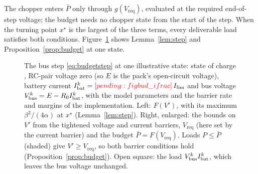The chopper enters $\bar P$ only through $g(V_{\mathrm{req}})$, evaluated at the required end-of-step voltage; the budget needs no chopper state from the start of the step. When the turning point $x^\star$ is the largest of the three terms, every deliverable load satisfies both conditions. Figure~\ref{fig:budget} shows Lemma~\ref{lem:step} and Proposition~\ref{prop:budget} at one state.
\begin{figure}[tbp]\centering{}\caption{The bus step \eqref{eq:budgetstep} at one illustrative state: state of charge , RC-pair voltage zero (so $E$ is the pack's open-circuit voltage), battery current $\Ib^k=\res{figbud_ifrac}\,I_{\lim}$ and bus voltage $V_{\mathrm{bus}}^k=E-R_0I_{\mathrm{bat}}^k$, with the model parameters and the barrier rate and margins of the implementation. Left: $F(V')$, with its maximum $\beta^2/(4\alpha)$ at $x^\star$ (Lemma~\ref{lem:step}). Right, enlarged: the bounds on $V'$ from the tightened voltage and current barriers, $V_{\mathrm{req}}$ (here set by the current barrier) and the budget $\bar P=F(V_{\mathrm{req}})$. Loads $P\le\bar P$ (shaded) give $V'\ge V_{\mathrm{req}}$, so both barrier conditions hold (Proposition~\ref{prop:budget}). Open square: the load $V_{\mathrm{bus}}^kI_{\mathrm{bat}}^k$, which leaves the bus voltage unchanged.}\label{fig:budget}\end{figure}

